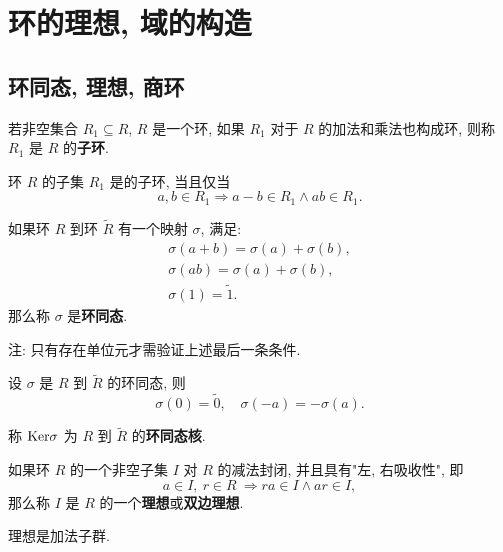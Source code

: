 \chapter{环的理想, 域的构造}


\section{环同态, 理想, 商环}

\begin{definition}\label{子环}
	若非空集合 $R_1\subseteq R$, $R$ 是一个环, 如果 $R_1$ 对于 $R$ 的加法和乘法也构成环, 则称 $R_1$ 是 $R$ 的\textbf{子环}.
\end{definition}

\begin{proposition}
	环 $R$ 的子集 $R_1$ 是的子环, 当且仅当 $$a,b\in R_1\Rightarrow a-b\in R_1\wedge ab\in R_1.$$
\end{proposition}

\begin{definition}\label{环同态}
	如果环 $R$ 到环 $\widetilde{R}$ 有一个映射 $\sigma$, 满足:
	$$
	\begin{array}{l}
		\sigma(a+b)=\sigma(a)+\sigma(b), \\
		\sigma(ab)=\sigma(a)+\sigma(b), \\
		\sigma(1)=\widetilde{1}.
	\end{array}
	$$
	那么称 $\sigma$ 是\textbf{环同态}.
\end{definition}

注: 只有存在单位元才需验证上述最后一条条件.

\begin{property}
	设 $\sigma$ 是 $R$ 到 $\widetilde{R}$ 的环同态, 则
	$$\sigma(0)=\widetilde{0},\quad\sigma(-a)=-\sigma(a).$$
\end{property}

\begin{definition}
	称 $\text {Ker} \sigma$ 为 $R$ 到 $\widetilde{R}$ 的\textbf{环同态核}.
\end{definition}

\begin{definition}\label{理想}
	如果环 $R$ 的一个非空子集 $I$ 对 $R$ 的减法封闭, 并且具有"左, 右吸收性", 即 $$a\in I,\ r\in R\ \Rightarrow ra \in I\wedge ar\in I,$$ 那么称 $I$ 是 $R$ 的一个\textbf{理想}或\textbf{双边理想}.
\end{definition}

\begin{corollary}
	理想是加法子群.
\end{corollary}

